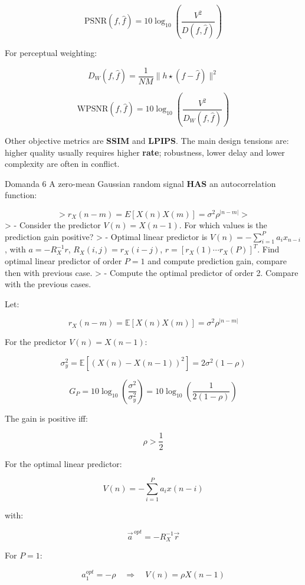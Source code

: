 $$
\text{PSNR}(f,\hat{f}) = 10\log_{10}\left(\frac{V^2}{D(f,\hat{f})}\right)
$$


For perceptual weighting:


$$
D_W(f,\hat{f}) = \frac{1}{NM}\|h \star (f-\hat{f})\|^2
$$



$$
\text{WPSNR}(f,\hat{f}) = 10\log_{10}\left(\frac{V^2}{D_W(f,\hat{f})}\right)
$$


Other objective metrics are \textbf{\textbf{SSIM}} and \textbf{\textbf{LPIPS}}. The main design tensions are: higher quality usually requires higher \textbf{rate}; robustness, lower delay and lower complexity are often in conflict.



\begin{questionbox}{Domanda 6}
A zero-mean Gaussian random signal \textbf{HAS} an autocorrelation function:
\end{questionbox}

$$
> r_X(n-m)=E[X(n)X(m)] = \sigma^2\rho^{|n-m|}
> $$
> - Consider the predictor $V(n)=X(n-1)$. For which values is the prediction gain positive?
> - Optimal linear predictor is $V(n)=-\sum_{i=1}^{P} a_i x_{n-i}$, with $a=-R_X^{-1}r$, $R_X(i,j)=r_X(i-j)$, $r=[r_X(1)\cdots r_X(P)]^T$. Find optimal linear predictor of order $P=1$ and compute prediction gain, compare then with previous case.
> - Compute the optimal predictor of order 2. Compare with the previous cases.

Let:


$$
r_X(n-m)=\mathbb{E}[X(n)X(m)] = \sigma^2\rho^{|n-m|}
$$


For the predictor $V(n)=X(n-1)$:


$$
\sigma_y^2 = \mathbb{E}[(X(n)-X(n-1))^2] = 2\sigma^2(1-\rho)
$$



$$
G_P = 10\log_{10}\left(\frac{\sigma^2}{\sigma_y^2}\right)
=10\log_{10}\left(\frac{1}{2(1-\rho)}\right)
$$


The gain is positive iff:


$$
\rho > \frac{1}{2}
$$


For the optimal linear predictor:


$$
V(n) = -\sum_{i=1}^{P} a_i x(n-i)
$$


with:


$$
\vec{a}^{\,opt} = -R_X^{-1}\vec{r}
$$


For $P=1$:


$$
a_1^{opt}=-\rho \quad \Rightarrow \quad V(n)=\rho X(n-1)
$$



